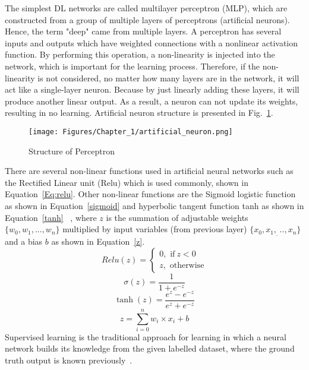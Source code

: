 The simplest DL networks are called multilayer perceptron (MLP), which are constructed from a group of multiple layers of perceptrons (artificial neurons).
Hence, the term "deep" came from multiple layers.
A perceptron has several inputs and outputs which have weighted connections with a nonlinear activation function.
By performing this operation, a non-linearity is injected into the network, which is important for the learning process.
Therefore, if the non-linearity is not considered, no matter how many layers are in the network, it will act like a single-layer neuron. 
Because by just linearly adding these layers, it will produce another linear output.
As a result, a neuron can not update its weights, resulting in no learning. 
Artificial neuron structure is presented in Fig.~\ref{fig:artificial Neuron}.
\begin{figure} [!ht]
	\begin{center}
		\centering
		\texttt{[image: Figures/Chapter\_1/artificial\_neuron.png]}
	\end{center}
	\caption{Structure of Perceptron} 
	\label{fig:artificial Neuron}
\end{figure}
There are several non-linear functions used in artificial neural networks such as the Rectified Linear unit (Relu) which is used commonly, shown in Equation~\ref{Eq:relu}. Other non-linear functions are the Sigmoid logistic function as shown in Equation~\ref{sigmoid} and hyperbolic tangent function tanh as shown in Equation~\ref{tanh} ~\cite{Lecun2015}, where \(z\) is the summation of adjustable weights \(\{w_0,w_1,...,w_n \}\) multiplied by input variables (from previous layer) \(\{x_0,x_1,_...,x_n\}\) and a bias \(b\) as shown in Equation~\ref{z}.
\begin{equation}
	Relu(z) = 
	\begin{cases}
		0,  \text{  if}\ z<0\\
		z,  \text{  otherwise}
	\end{cases}
	\label{Eq:relu}
\end{equation}
\begin{equation}
	\sigma(z) = \frac{1}{1+e^{-z}}
	\label{sigmoid}
\end{equation}
\begin{equation}
	\tanh(z)=  \frac{e^z-e^{-z}}{e^z+e^{-z}}
	\label{tanh}
\end{equation}
\begin{equation}
	z= \sum_{i=0}^{n}  w_i\times x_i +b
	\label{z}
\end{equation}
Supervised learning is the traditional approach for learning in which a neural network builds its knowledge from the given labelled dataset, where the ground truth output is known previously~\cite{Lecun2015}.


